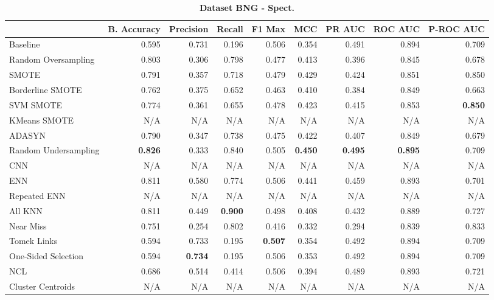 \begin{table}[H]
    \centering
    \setlength\tabcolsep{2pt}
    \begin{tabularx}{\textwidth}{lRRRRRRRR}
        & B. Accuracy & Precision & Recall & F1 Max & MCC & PR AUC & ROC AUC & P-ROC AUC \\
        \midrule
        Baseline & 0.595 & 0.731 & 0.196 & 0.506 & 0.354 & 0.491 & 0.894 & 0.709 \\
        Random Oversampling & 0.803 & 0.306 & 0.798 & 0.477 & 0.413 & 0.396 & 0.845 & 0.678 \\
        SMOTE & 0.791 & 0.357 & 0.718 & 0.479 & 0.429 & 0.424 & 0.851 & 0.850 \\
        Borderline SMOTE & 0.762 & 0.375 & 0.652 & 0.463 & 0.410 & 0.384 & 0.849 & 0.663 \\
        SVM SMOTE & 0.774 & 0.361 & 0.655 & 0.478 & 0.423 & 0.415 & 0.853 & \textbf{0.850} \\
        KMeans SMOTE & N/A & N/A & N/A & N/A & N/A & N/A & N/A & N/A \\
        ADASYN & 0.790 & 0.347 & 0.738 & 0.475 & 0.422 & 0.407 & 0.849 & 0.679 \\
        Random Undersampling & \textbf{0.826} & 0.333 & 0.840 & 0.505 & \textbf{0.450} & \textbf{0.495} & \textbf{0.895} & 0.709 \\
        CNN & N/A & N/A & N/A & N/A & N/A & N/A & N/A & N/A \\
        ENN & 0.811 & 0.580 & 0.774 & 0.506 & 0.441 & 0.459 & 0.893 & 0.701 \\
        Repeated ENN & N/A & N/A & N/A & N/A & N/A & N/A & N/A & N/A \\
        All KNN & 0.811 & 0.449 & \textbf{0.900} & 0.498 & 0.408 & 0.432 & 0.889 & 0.727 \\
        Near Miss & 0.751 & 0.254 & 0.802 & 0.416 & 0.332 & 0.294 & 0.839 & 0.833 \\
        Tomek Links & 0.594 & 0.733 & 0.195 & \textbf{0.507} & 0.354 & 0.492 & 0.894 & 0.709 \\
        One-Sided Selection & 0.594 & \textbf{0.734} & 0.195 & 0.506 & 0.353 & 0.492 & 0.894 & 0.709 \\
        NCL & 0.686 & 0.514 & 0.414 & 0.506 & 0.394 & 0.489 & 0.893 & 0.721 \\
        Cluster Centroids & N/A & N/A & N/A & N/A & N/A & N/A & N/A & N/A \\
    \end{tabularx}
    \vspace{1mm}
    \caption{\textbf{Dataset BNG - Spect.}}
\end{table}
